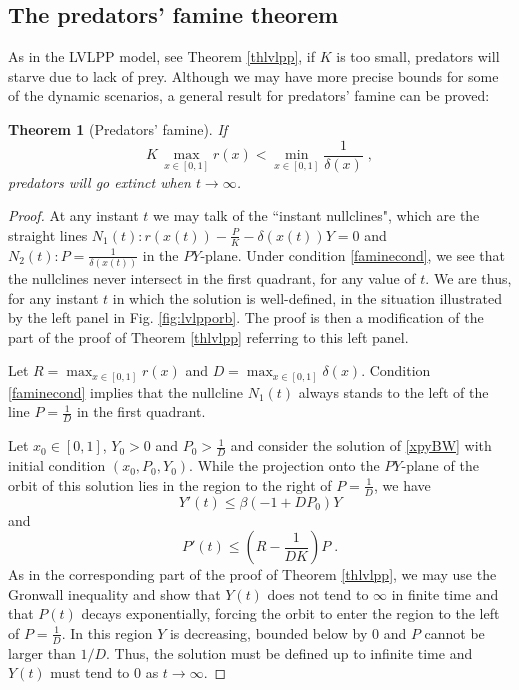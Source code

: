 \documentclass[12pt]{article}
\newtheorem{theorem}{Theorem}[section]
\theoremstyle{definition}
\begin{document}
\subsection{The predators' famine theorem} \label{sub:fam}
As in the LVLPP model, see Theorem \ref{thlvlpp}, if $K$ is too small, predators will starve due to lack of prey. Although we may have more precise bounds for some of the dynamic scenarios, a general result for predators' famine can be proved:
\begin{theorem}[Predators' famine] \label{thfamine}
	If 
	\begin{equation} \label{faminecond}
		K \, \max_{x \in [0,1]} r(x) < \min_{x\in [0,1]}\frac{1}{\delta(x)}\;,
	\end{equation} predators will go extinct when $t \rightarrow \infty$.
\end{theorem}
\begin{proof}
	At any instant $t$ we may talk of the ``instant nullclines", which are the straight lines $N_1(t): r(x(t)) - \frac{P}{K} - \delta(x(t)) Y=0$ and $N_2(t): P=\frac{1}{\delta(x(t))}$ in the $PY$-plane. Under condition \eqref{faminecond}, we see that the nullclines never intersect in the first quadrant, for any value of $t$. We are thus, for any instant $t$ in which the solution is well-defined, in the situation illustrated by the left panel in Fig. \ref{fig:lvlpporb}. The proof is then a modification of the part of the proof of Theorem \ref{thlvlpp} referring to this left panel.
	
	Let $R=\max_{x \in [0,1]}r(x)$ and $D=\max_{x\in[0,1]} \delta(x)$. Condition \eqref{faminecond} implies that the nullcline $N_1(t)$ always stands to the left of the line $P=\frac{1}{D}$ in the first quadrant. 
	
	Let $x_0 \in [0,1]$, $Y_0>0$ and $P_0>\frac{1}{D}$ and consider the solution of \eqref{xpyBW} with initial condition $(x_0,P_0,Y_0)$. While the projection onto the $PY$-plane of the orbit of this solution lies in the region to the right of $P=\frac{1}{D}$, we have
	\[Y'(t) \leq \beta(-1+ D P_0)Y\]
	and
	\[P'(t)\leq (R- \frac{1}{D K})P\;.\]
	As in the corresponding part of the proof of Theorem \ref{thlvlpp}, we may use the Gronwall inequality and show that $Y(t)$ does not tend to $\infty$ in finite time and that $P(t)$ decays exponentially, forcing the orbit to enter the region to the left of $P=\frac{1}{D}$. In this region $Y$ is decreasing, bounded below by 0 and $P$ cannot be larger than $1/D$. Thus, the solution must be defined up to infinite time and $Y(t)$ must tend to 0 as $t \rightarrow \infty$.
\end{proof}
\end{document}

